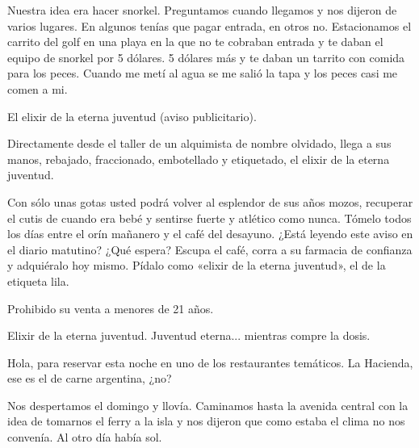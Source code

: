 \documentclass[12pt,twoside,openright,a5paper]{book}
\begin{document}
Nuestra idea era hacer snorkel. Preguntamos cuando llegamos y nos
dijeron de varios lugares. En algunos tenías que pagar entrada, en otros
no. Estacionamos el carrito del golf en una playa en la que no te cobraban
entrada y te daban el equipo de snorkel por 5 dólares. 5 dólares más y
te daban un tarrito con comida para los peces. Cuando me metí al agua
se me salió la tapa y los peces casi me comen a mi.


\vspace{0.5cm}
\hrulefill\hspace{0.2cm} \decofourleft\decofourright \hspace{0.2cm} \hrulefill
\vspace{0.5cm}

El elixir de la eterna juventud (aviso publicitario).

Directamente desde el taller de un alquimista de nombre olvidado, llega a
sus manos, rebajado, fraccionado, embotellado y etiquetado, el elixir de
la eterna juventud.

Con sólo unas gotas usted podrá volver al esplendor de sus años mozos,
recuperar el cutis de cuando era bebé y sentirse fuerte y atlético
como nunca. Tómelo todos los días entre el orín mañanero y el café
del desayuno.  ¿Está leyendo este aviso en el diario matutino? ¿Qué
espera? Escupa el café, corra a su farmacia de confianza y adquiéralo hoy
mismo. Pídalo como «elixir de la eterna juventud», el de la etiqueta lila.

Prohibido su venta a menores de 21 años.

Elixir de la eterna juventud. Juventud eterna... mientras compre la dosis.


\vspace{0.5cm}
\hrulefill\hspace{0.2cm} \decofourleft\decofourright \hspace{0.2cm} \hrulefill
\vspace{0.5cm}

Hola, para reservar esta noche en uno de los restaurantes temáticos. La
Hacienda, ese es el de carne argentina, ¿no?


\vspace{0.5cm}
\hrulefill\hspace{0.2cm} \decofourleft\decofourright \hspace{0.2cm} \hrulefill
\vspace{0.5cm}

Nos despertamos el domingo y llovía. Caminamos hasta la avenida central
con la idea de tomarnos el ferry a la isla y nos dijeron que como estaba
el clima no nos convenía. Al otro día había sol.
\end{document}
